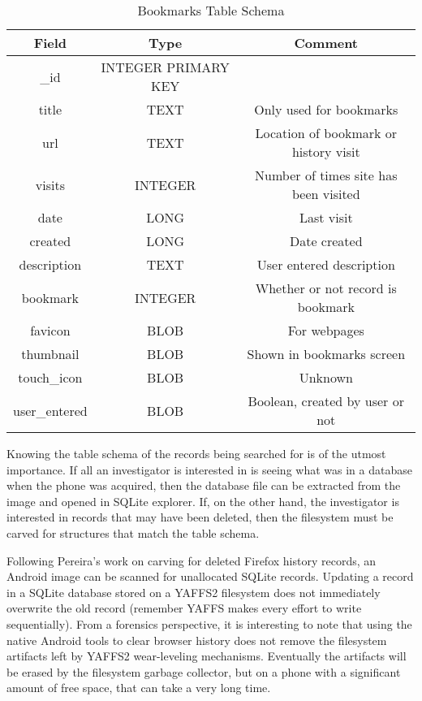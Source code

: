 \begin{table}[htpb]
\begin {center}
	\begin{tabular}{| c | c | c |}
	\hline
	Field & Type & Comment \\
	\hline
	\_id & INTEGER PRIMARY KEY & \\
	title & TEXT  &  Only used for bookmarks \\
	url & TEXT  & Location of bookmark or history visit \\
	visits & INTEGER  & Number of times site has been visited \\
	date & LONG  &  Last visit \\
	created & LONG &  Date created \\
	description & TEXT &  User entered description \\
	bookmark & INTEGER & Whether or not record is bookmark \\
	favicon & BLOB &  For webpages \\
	thumbnail & BLOB &  Shown in bookmarks screen \\
	touch\_icon & BLOB &  Unknown \\
	user\_entered & BLOB & Boolean, created by user or not \\
	\hline
	\end{tabular}
\end{center}
	\caption{Bookmarks Table Schema}
	\label{tab:bookmarkschema}
\end{table}

Knowing the table schema of the records being searched for is of the utmost importance.  If all an investigator is interested in is
seeing what was in a database when the phone was acquired, then the database file can be extracted from the image and opened in
SQLite explorer.  If, on the other hand, the investigator is interested in records that may have been deleted, then the filesystem
must be carved for structures that match the table schema.

Following Pereira's work on carving for deleted Firefox history records, an Android image can be scanned for unallocated SQLite
records.  Updating a record in a SQLite database stored on a YAFFS2 filesystem does not immediately overwrite the old record
(remember YAFFS makes every effort to write sequentially).  From a forensics perspective, it is interesting to note that using the
native Android tools to clear browser history does not remove the filesystem artifacts left by YAFFS2 wear-leveling mechanisms.
Eventually the artifacts will be erased by the filesystem garbage collector, but on a phone with a significant amount of free space,
that can take a very long time.

